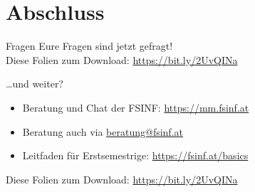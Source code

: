 \documentclass{beamer}
\begin{document}
\section*{Abschluss}
\begin{frame}{Fragen}
    Eure Fragen sind jetzt gefragt!\\
    \vspace{2cm}
    Diese Folien zum Download: \url{https://bit.ly/2UvQINa}
\end{frame}

\begin{frame}{\ldots und weiter?}
    \begin{itemize}
        \item Beratung und Chat der FSINF: \url{https://mm.fsinf.at}
        \item Beratung auch via \url{beratung@fsinf.at}
        \item Leitfaden für Erstsemestrige: \url{https://fsinf.at/basics}
    \end{itemize}

    \vspace{2cm}
    Diese Folien zum Download: \url{https://bit.ly/2UvQINa}
\end{frame}
\end{document}
